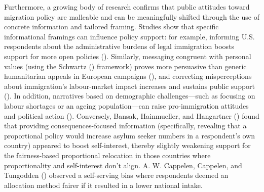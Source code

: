 \documentclass[
  12pt,
  a4paper,
]{article}
\begin{document}
Furthermore, a growing body of research confirms that public attitudes toward migration policy are malleable and can be meaningfully shifted through the use of concrete information and tailored framing. Studies show that specific informational framings can influence policy support: for example, informing U.S. respondents about the administrative burdens of legal immigration boosts support for more open policies (). Similarly, messaging congruent with personal values (using the Schwartz () framework) proves more persuasive than generic humanitarian appeals in European campaigns (), and correcting misperceptions about immigration's labour-market impact increases and sustains public support (). In addition, narratives based on demographic challenges---such as focusing on labour shortages or an ageing population---can raise pro-immigration attitudes and political action (). Conversely, Bansak, Hainmueller, and Hangartner () found that providing consequences-focused information (specifically, revealing that a proportional policy would increase asylum seeker numbers in a respondent's own country) appeared to boost self-interest, thereby slightly weakening support for the fairness-based proportional relocation in those countries where proportionality and self-interest don't align. A. W. Cappelen, Cappelen, and Tungodden () observed a self-serving bias where respondents deemed an allocation method fairer if it resulted in a lower national intake.
\end{document}
